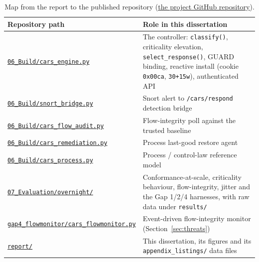 \begin{table}[h]
\centering
\small
\begin{tabular}{p{}p{}}
\hline
Repository path & Role in this dissertation \\
\hline
\href{\repourl/blob/main/06_Build/cars_engine.py}{\texttt{06\_Build/cars\_engine.py}} & The controller: \texttt{classify()}, criticality elevation, \texttt{select\_response()}, GUARD binding, reactive install (cookie \texttt{0x00ca}, \texttt{30+15w}), authenticated API \\
\href{\repourl/blob/main/06_Build/snort_bridge.py}{\texttt{06\_Build/snort\_bridge.py}} & Snort alert to \texttt{/cars/respond} detection bridge \\
\href{\repourl/blob/main/06_Build/cars_flow_audit.py}{\texttt{06\_Build/cars\_flow\_audit.py}} & Flow-integrity poll against the trusted baseline \\
\href{\repourl/blob/main/06_Build/cars_remediation.py}{\texttt{06\_Build/cars\_remediation.py}} & Process last-good restore agent \\
\href{\repourl/blob/main/06_Build/cars_process.py}{\texttt{06\_Build/cars\_process.py}} & Process / control-law reference model \\
\href{\repourl/tree/main/07_Evaluation/overnight}{\texttt{07\_Evaluation/overnight/}} & Conformance-at-scale, criticality behaviour, flow-integrity, jitter and the Gap 1/2/4 harnesses, with raw data under \texttt{results/} \\
\href{\repourl/blob/main/07_Evaluation/overnight/gap4_flowmonitor/cars_flowmonitor.py}{\texttt{gap4\_flowmonitor/cars\_flowmonitor.py}} & Event-driven flow-integrity monitor (Section~\ref{sec:threats}) \\
\href{\repourl/tree/main/report}{\texttt{report/}} & This dissertation, its figures and its \texttt{appendix\_listings/} data files \\
\hline
\end{tabular}
\caption{Map from the report to the published repository (\href{\repourl}{the project GitHub repository}).}
\label{tab:repomap}
\end{table}


